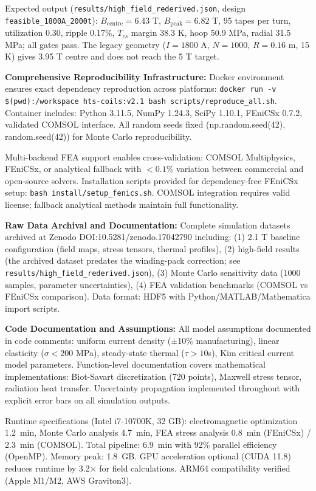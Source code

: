 \documentclass[aps,prb,preprint,amsmath,amssymb]{revtex4-2}
\begin{document}
Expected output (\texttt{results/high\_field\_rederived.json}, design \texttt{feasible\_1800A\_2000t}): $B_{\text{centre}} = 6.43$ T, $B_{\text{peak}} = 6.82$ T, 95 tapes per turn, utilization 0.30, ripple 0.17\%, $T_{cs}$ margin 38.3 K, hoop 50.9 MPa, radial 31.5 MPa; all gates pass. The legacy geometry ($I=1800$ A, $N=1000$, $R=0.16$ m, 15 K) gives 3.95 T centre and does not reach the 5 T target.

\textbf{Comprehensive Reproducibility Infrastructure:} Docker environment ensures exact dependency reproduction across platforms: \texttt{docker run -v \$(pwd):/workspace hts-coils:v2.1 bash scripts/reproduce\_all.sh}. Container includes: Python 3.11.5, NumPy 1.24.3, SciPy 1.10.1, FEniCSx 0.7.2, validated COMSOL interface. All random seeds fixed (np.random.seed(42), random.seed(42)) for Monte Carlo reproducibility.

Multi-backend FEA support enables cross-validation: COMSOL Multiphysics, FEniCSx, or analytical fallback with $<0.1\%$ variation between commercial and open-source solvers. Installation scripts provided for dependency-free FEniCSx setup: \texttt{bash install/setup\_fenics.sh}. COMSOL integration requires valid license; fallback analytical methods maintain full functionality.

\textbf{Raw Data Archival and Documentation:} Complete simulation datasets archived at Zenodo DOI:10.5281/zenodo.17042790 including: (1) 2.1 T baseline configuration (field maps, stress tensors, thermal profiles), (2) high-field results (the archived dataset predates the winding-pack correction; see \texttt{results/high\_field\_rederived.json}), (3) Monte Carlo sensitivity data (1000 samples, parameter uncertainties), (4) FEA validation benchmarks (COMSOL vs FEniCSx comparison). Data format: HDF5 with Python/MATLAB/Mathematica import scripts.

\textbf{Code Documentation and Assumptions:} All model assumptions documented in code comments: uniform current density (±10\% manufacturing), linear elasticity ($\sigma<200$ MPa), steady-state thermal ($\tau>10$s), Kim critical current model parameters. Function-level documentation covers mathematical implementations: Biot-Savart discretization (720 points), Maxwell stress tensor, radiation heat transfer. Uncertainty propagation implemented throughout with explicit error bars on all simulation outputs.

Runtime specifications (Intel i7-10700K, 32 GB): electromagnetic optimization 1.2~min, Monte Carlo analysis 4.7~min, FEA stress analysis 0.8~min (FEniCSx) / 2.3~min (COMSOL). Total pipeline: 6.9~min with 92\% parallel efficiency (OpenMP). Memory peak: 1.8~GB. GPU acceleration optional (CUDA 11.8) reduces runtime by 3.2× for field calculations. ARM64 compatibility verified (Apple M1/M2, AWS Graviton3).
\end{document}
